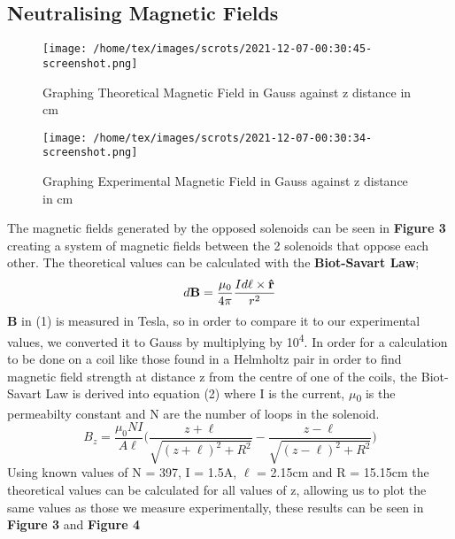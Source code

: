 \documentclass{article}
\begin{document}
   \subsection{Neutralising Magnetic Fields}
   \begin{figure}
       \centering
       \texttt{[image: /home/tex/images/scrots/2021-12-07-00:30:45-screenshot.png]}
       \caption{Graphing Theoretical Magnetic Field in Gauss against z distance in cm}
   \end{figure}
   \begin{figure}
       \centering
       \texttt{[image: /home/tex/images/scrots/2021-12-07-00:30:34-screenshot.png]}
       \caption{Graphing Experimental Magnetic Field in Gauss against z distance in cm}
   \end{figure}
   The magnetic fields generated by the opposed solenoids can be seen in \textbf{Figure 3}
   creating a system of magnetic fields between the 2 solenoids that oppose each other. The theoretical values can be calculated
   with the \textbf{Biot-Savart Law};
   \begin{equation}
       d{\bf{B}} = \frac{{\mu _0 }}{{4\pi }}\frac{{Id\ell \times {\bf{\hat r}}}}{{r^2 }}
   \end{equation}
   \textbf{B} in (1) is measured in Tesla, so in order to compare it to our experimental values, we converted it to Gauss by
   multiplying by 10\textsuperscript{4}. \newline
   In order for a calculation to be done on a coil like those found in a Helmholtz pair in order to find magnetic field strength at 
   distance z from the centre of one of the coils, the Biot-Savart Law is derived into equation (2) where I is the current, \(\mu\)\textsubscript{0} is the permeabilty 
   constant and N are the number of loops in the solenoid.
   \begin{equation}
       B_z = \frac{\mu _0 N I}{A \ell}\bigg( \frac{z + \ell}{\sqrt{(z + \ell)^2 + R^2}} - \frac{z - \ell}{\sqrt{(z - \ell)^2 + R^2}}\bigg)
   \end{equation}
   Using known values of N = 397, I = 1.5A, \(\ell\) = 2.15cm and R = 15.15cm the theoretical values can be calculated for all values of z, allowing us to plot the same
   values as those we measure experimentally, these results can be seen in \textbf{Figure 3} and \textbf{Figure 4}
\end{document}
